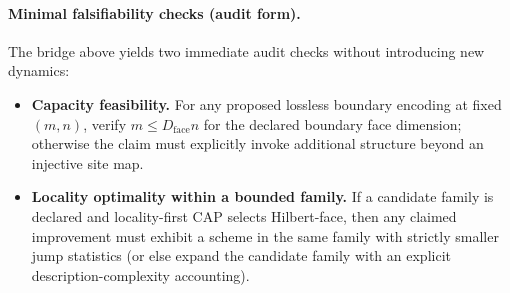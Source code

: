 \paragraph{Minimal falsifiability checks (audit form).}
\AuditTag The bridge above yields two immediate audit checks without introducing new dynamics:
\begin{itemize}
\item \textbf{Capacity feasibility.} For any proposed lossless boundary encoding at fixed $(m,n)$, verify $m\le D_{\mathrm{face}}n$ for the declared boundary face dimension; otherwise the claim must explicitly invoke additional structure beyond an injective site map.
\item \textbf{Locality optimality within a bounded family.} If a candidate family is declared and locality-first CAP selects Hilbert-face, then any claimed improvement must exhibit a scheme in the same family with strictly smaller jump statistics (or else expand the candidate family with an explicit description-complexity accounting).
\end{itemize}

